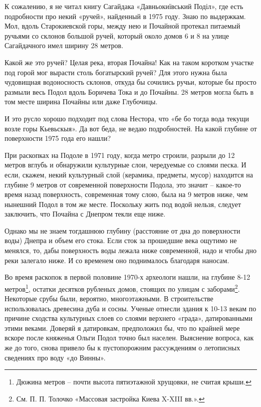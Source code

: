 К сожалению, я не читал книгу Сагайдака «Давньокиївський Поділ», где есть подробности про некий «ручей», найденный в 1975 году. Знаю по выдержкам. Мол, вдоль Старокиевской горы, между нею и Почайной протекал питаемый ручьями со склонов большой ручей, который около домов 6 и 8 на улице Сагайдачного имел ширину 28 метров. 

Какой же это ручей? Целая река, вторая Почайна! Как на таком коротком участке под горой мог вырасти столь богатырский ручей? Для этого нужна была чудовищная водоносность склонов, откуда бы сочились ручьи, которые бы просто размыли весь Подол вдоль Боричева Тока и до Почайны. 28 метров могла быть в том месте ширина Почайны или даже Глубочицы.

И это русло хорошо подходит под слова Нестора, что «бе бо тогда вода текущи возле горы Кьевьскыя». Да вот беда, не ведаю подробностей. На какой глубине от поверхности 1975 года его нашли?

При раскопках на Подоле в 1971 году, когда метро строили, разрыли до 12 метров вглубь и обнаружили культурные слои, чередуемые со слоями песка. И если, скажем, некий культурный слой (керамика, предметы, мусор) находится на глубине 9 метров от современной поверхности Подола, это значит – какое-то время назад поверхность, современная тому слою, была на 9 метров ниже, чем нынешний Подол в том же месте. Поскольку жить под водой нельзя, следует заключить, что Почайна с Днепром текли еще ниже.

Однако мы не знаем тогдашнюю глубину (расстояние от дна до поверхности воды) Днепра и объем его стока. Если сток за прошедшие века ощутимо не менялся, то, дабы поверхность воды лежала ниже современной, надо и чтобы дно реки залегало ниже. И со временем оно поднималось благодаря наносам.

Во время раскопок в первой половине 1970-х археологи нашли, на глубине 8-12 метров\footnote{Дюжина метров – почти высота пятиэтажной хрущовки, не считая крыши.}, остатки десятков рубленых домов, стоящих по улицам с заборами\footnote{См. П. П. Толочко «Массовая застройка Киева X-XIII вв.».}. Некоторые срубы были, вероятно, многоэтажными. В строительстве использовалась древесина дуба и сосны. Ученые отнесли здания к 10-13 векам по причине сходства культурных слоев со слоями верхнего «града», датированными этими веками. Доверяй я датировкам, предположил бы, что по крайней мере вскоре после княженья Ольги Подол точно был населен. Выяснение вопроса, как же до того, снова привело бы к пустопорожним рассуждениям о летописных сведениях про воду «до Винны».

